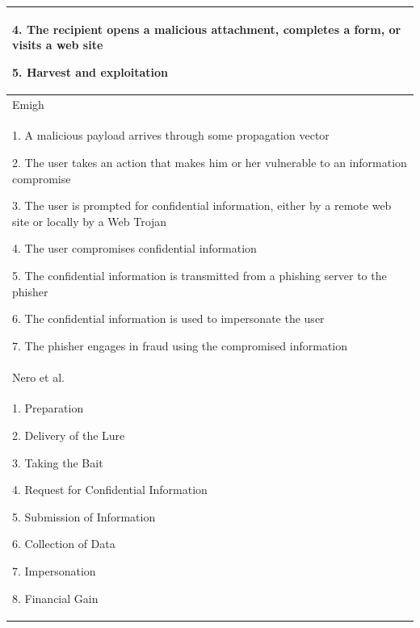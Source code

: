 \begin{flushleft}
\begin{longtable}{|>{\raggedright}p{12cm}|}
{\scriptsize{}4. The recipient opens a malicious attachment, completes
a form, or visits a web site}{\scriptsize \par}

{\scriptsize{}5. Harvest and exploitation}\tabularnewline
\hline 
Emigh \citep{emigh:2005}\tabularnewline
\hline 
{\scriptsize{}1. A malicious payload arrives through some propagation
vector}{\scriptsize \par}

{\scriptsize{}2. The user takes an action that makes him or her vulnerable
to an information compromise}{\scriptsize \par}

{\scriptsize{}3. The user is prompted for confidential information,
either by a remote web site or locally by a Web Trojan}{\scriptsize \par}

{\scriptsize{}4. The user compromises confidential information}{\scriptsize \par}

{\scriptsize{}5. The confidential information is transmitted from
a phishing server to the phisher}{\scriptsize \par}

{\scriptsize{}6. The confidential information is used to impersonate
the user}{\scriptsize \par}

{\scriptsize{}7. The phisher engages in fraud using the compromised
information}\tabularnewline
\hline 
Nero et al. \citep{nero:2011}\tabularnewline
\hline 
{\scriptsize{}1. Preparation }{\scriptsize \par}

{\scriptsize{}2. Delivery of the Lure }{\scriptsize \par}

{\scriptsize{}3. Taking the Bait }{\scriptsize \par}

{\scriptsize{}4. Request for Confidential Information }{\scriptsize \par}

{\scriptsize{}5. Submission of Information }{\scriptsize \par}

{\scriptsize{}6. Collection of Data }{\scriptsize \par}

{\scriptsize{}7. Impersonation }{\scriptsize \par}

{\scriptsize{}8. Financial Gain}\tabularnewline
\hline 
\end{longtable}
\par\end{flushleft}

